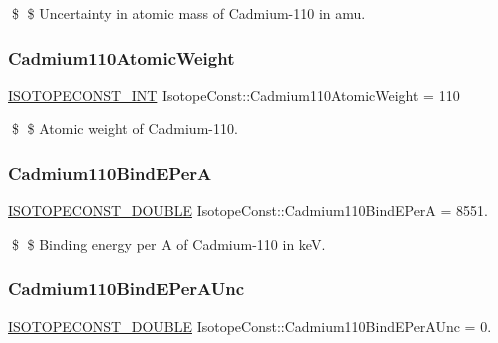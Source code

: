 \$ \$ Uncertainty in atomic mass of Cadmium-\/110 in amu. \mbox{\label{group___isotope_const-_cadmium-_cd110_gaad02d7d5ed627304153bfe749e026c22}} 
\subsubsection{\texorpdfstring{Cadmium110\+Atomic\+Weight}{Cadmium110AtomicWeight}}
{\footnotesize\ttfamily \mbox{\hyperlink{group___isotope_const-_macros_ga5f18360b3e99483a35c32d789e62621c}{I\+S\+O\+T\+O\+P\+E\+C\+O\+N\+S\+T\+\_\+\+I\+NT}} Isotope\+Const\+::\+Cadmium110\+Atomic\+Weight = 110}

\$ \$ Atomic weight of Cadmium-\/110. \mbox{\label{group___isotope_const-_cadmium-_cd110_ga2b60c46d704c82cb9ae2be85c04283e0}} 
\subsubsection{\texorpdfstring{Cadmium110\+Bind\+E\+PerA}{Cadmium110BindEPerA}}
{\footnotesize\ttfamily \mbox{\hyperlink{group___isotope_const-_macros_ga8f45a7272ce02c0b4c65c44636ed719a}{I\+S\+O\+T\+O\+P\+E\+C\+O\+N\+S\+T\+\_\+\+D\+O\+U\+B\+LE}} Isotope\+Const\+::\+Cadmium110\+Bind\+E\+PerA = 8551.}

\$ \$ Binding energy per A of Cadmium-\/110 in keV. \mbox{\label{group___isotope_const-_cadmium-_cd110_ga8b9c1be4570ac17ad89c1dacf683ed4a}} 
\subsubsection{\texorpdfstring{Cadmium110\+Bind\+E\+Per\+A\+Unc}{Cadmium110BindEPerAUnc}}
{\footnotesize\ttfamily \mbox{\hyperlink{group___isotope_const-_macros_ga8f45a7272ce02c0b4c65c44636ed719a}{I\+S\+O\+T\+O\+P\+E\+C\+O\+N\+S\+T\+\_\+\+D\+O\+U\+B\+LE}} Isotope\+Const\+::\+Cadmium110\+Bind\+E\+Per\+A\+Unc = 0.}


